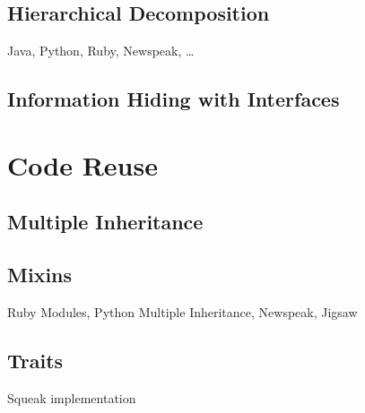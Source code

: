 \subsection{Hierarchical Decomposition}
Java, Python, Ruby, Newspeak, \ldots

\subsection{Information Hiding with Interfaces}


\section{Code Reuse}

\subsection{Multiple Inheritance}

\subsection{Mixins}
Ruby Modules, Python Multiple Inheritance, Newspeak, Jigsaw

\subsection{Traits}
Squeak implementation

